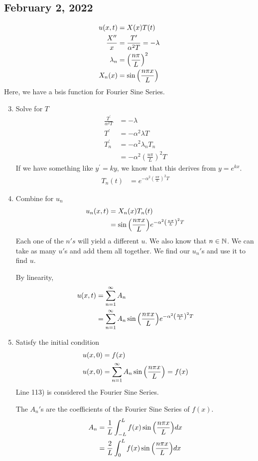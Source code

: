 \subsection*{February 2, 2022}
\begin{align}
  u(x, t) & = X(x)T(t)\\
  \frac{X^{\prime\prime}}{x} & = \frac{T^\prime}{\alpha^2 T} = - \lambda\\
  \lambda_n & = \left( \frac{n \pi}{L} \right)^2\\
  X_n(x) & = \sin \Big( \frac{n \pi x}{L} \Big)
\end{align}
Here, we have a bsis function for Fourier Sine Series.
\begin{enumerate}
  \setcounter{enumi}{2}
  \item Solve for $T$
  \begin{align}
    \frac{T^\prime}{\alpha^2 T} & = - \lambda\\
    T^\prime & = -\alpha^2 \lambda T\\
    T^\prime_n & = - \alpha^2 \lambda_n T_n\\
    & = -\alpha^2 \left( \frac{n \pi}{L} \right)^2 T
  \end{align}
  If we have something like $y^\prime = ky$, we know that this derives from $y = e^{kx}$.
  \begin{align}
    T_n(t) & = e^{-\alpha^2 \left( \frac{n \pi}{L} \right)^2 T}
  \end{align}
  \item Combine for $u_n$
  \begin{align}
    u_n(x, t) & = X_n(x)T_n(t)\\
    & = \sin \Big( \frac{n \pi x}{L} \Big) e^{-\alpha^2 \left( \frac{n \pi}{L} \right)^2 T}
  \end{align}
  Each one of the $n's$ will yield a different $u$. We also know that $n \in \mathbb N$. We can take as many $u'$s and add them all together. We find our $u_n'$s and use it to find $u$.

  By linearity,
  \begin{align}
    u(x, t) & = \sum^\infty_{n = 1} A_n\\
    & = \sum^\infty_{n = 1} A_n \sin \Big( \frac{n \pi x}{L} \Big) e^{-\alpha^2 \left( \frac{n \pi}{L} \right)^2 T}
  \end{align}

  \item Satisfy the initial condition
  \begin{align}
    u(x, 0) & = f(x)\\
    u(x, 0) & = \sum^\infty_{n = 1} A_n \sin \Big( \frac{n \pi x}{L} \Big) = f(x)
  \end{align}
  Line 113) is considered the Fourier Sine Series.

  The $A_n'$s are the coefficients of the Fourier Sine Series of $f(x)$.
  \begin{align}
    A_n & = \frac{1}{L} \int^L_{-L} f(x) \sin \Big( \frac{n \pi x}{L} \Big) dx\\
    & = \frac{2}{L} \int^L_0 f(x) \sin \Big( \frac{n \pi x}{L} \Big) dx
  \end{align}
\end{enumerate}

